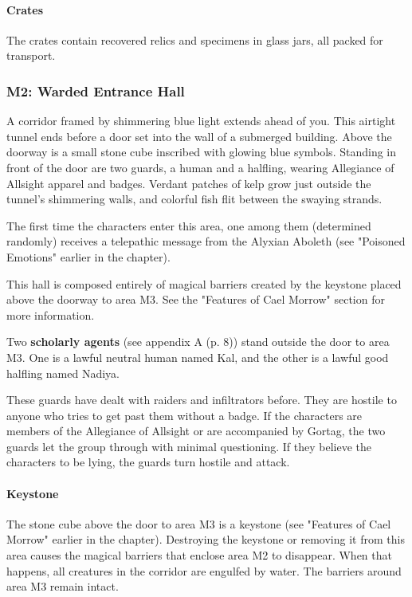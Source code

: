 \documentclass[a4paper, 11pt, bg=full, twocolumn, nooutline]{dndbook}
\begin{document}
\paragraph{Crates}

The crates contain recovered relics and specimens in glass jars, all packed for transport.

\subsubsection{M2: Warded Entrance Hall}

\begin{DndReadAloud}
A corridor framed by shimmering blue light extends ahead of you. This airtight tunnel ends before a door set into the wall of a submerged building. Above the doorway is a small stone cube inscribed with glowing blue symbols. Standing in front of the door are two guards, a human and a halfling, wearing Allegiance of Allsight apparel and badges. Verdant patches of kelp grow just outside the tunnel's shimmering walls, and colorful fish flit between the swaying strands.
\end{DndReadAloud}

The first time the characters enter this area, one among them (determined randomly) receives a telepathic message from the Alyxian Aboleth (see "Poisoned Emotions" earlier in the chapter).

This hall is composed entirely of magical barriers created by the keystone placed above the doorway to area M3. See the "Features of Cael Morrow" section for more information.

Two \textbf{scholarly agents} (see appendix A (p. 8)) stand outside the door to area M3. One is a lawful neutral human named Kal, and the other is a lawful good halfling named Nadiya.

These guards have dealt with raiders and infiltrators before. They are hostile to anyone who tries to get past them without a badge. If the characters are members of the Allegiance of Allsight or are accompanied by Gortag, the two guards let the group through with minimal questioning. If they believe the characters to be lying, the guards turn hostile and attack.

\paragraph{Keystone}

The stone cube above the door to area M3 is a keystone (see "Features of Cael Morrow" earlier in the chapter). Destroying the keystone or removing it from this area causes the magical barriers that enclose area M2 to disappear. When that happens, all creatures in the corridor are engulfed by water. The barriers around area M3 remain intact.
\end{document}
